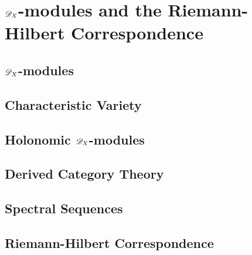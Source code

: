 \chapter{$\mathscr{D}_X$-modules and the Riemann-Hilbert Correspondence}\label{Ch: Chapter1}
\section{$\mathscr{D}_X$-modules}
\section{Characteristic Variety}
\section{Holonomic $\mathscr{D}_X$-modules}
\section{Derived Category Theory}
\section{Spectral Sequences}
\section{Riemann-Hilbert Correspondence}

